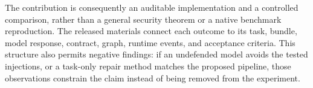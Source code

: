The contribution is consequently an auditable implementation and a controlled comparison, rather than a general security theorem or a native benchmark reproduction. The released materials connect each outcome to its task, bundle, model response, contract, graph, runtime events, and acceptance criteria. This structure also permits negative findings: if an undefended model avoids the tested injections, or a task-only repair method matches the proposed pipeline, those observations constrain the claim instead of being removed from the experiment.
